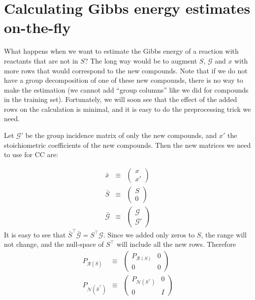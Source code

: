 \documentclass[11pt]{article}
\newcommand{\Gmat}{\mathcal{G}}
\newcommand{\PRmat}[1]{P_{\mathcal{R}\left(#1\right)}}
\newcommand{\PNmat}[1]{P_{\mathcal{N}\left(#1\right)}}
\begin{document}
\section{Calculating Gibbs energy estimates on-the-fly}

What happens when we want to estimate the Gibbs energy of a reaction with reactants that are not in $S$? The long way would be to augment $S$, $\Gmat$ and $x$ with more rows that would correspond to the new compounds. Note that if we do not have a group decomposition of one of these new compounds, there is no way to make the estimation (we cannot add ``group columns'' like we did for compounds in the training set). Fortunately, we will soon see that the effect of the added rows on the calculation is minimal, and it is easy to do the preprocessing trick we need.

Let $\Gmat'$ be the group incidence matrix of only the new compounds, and $x'$ the stoichiometric coefficients of the new compounds. Then the new matrices we need to use for CC are:

\begin{eqnarray}
	\bar{x} & \equiv & \left( \begin{array}{c} x \\ \hline x' \end{array} \right) \\
	\bar{S} & \equiv & \left( \begin{array}{c} S \\ \hline 0 \end{array} \right) \\
	\bar{\Gmat} & \equiv & \left( \begin{array}{c} \Gmat \\ \hline \Gmat'\end{array} \right)
\end{eqnarray}
It is easy to see that $\bar{S}^\top \bar{\Gmat} = S^\top \Gmat$. Since we added only zeros to $S$, the range will not change, and the null-space of $S^\top$ will include all the new rows. Therefore
\begin{eqnarray}
	\PRmat{\bar{S}} & \equiv & \left( \begin{array}{c|c} \PRmat{S} & 0 \\ \hline 0 & 0 \end{array} \right)	 \\
	\PNmat{\bar{S}^\top} & \equiv & \left( \begin{array}{c|c} \PNmat{S^\top} & 0 \\ \hline 0 & I \end{array} \right)
\end{eqnarray}
\end{document}
